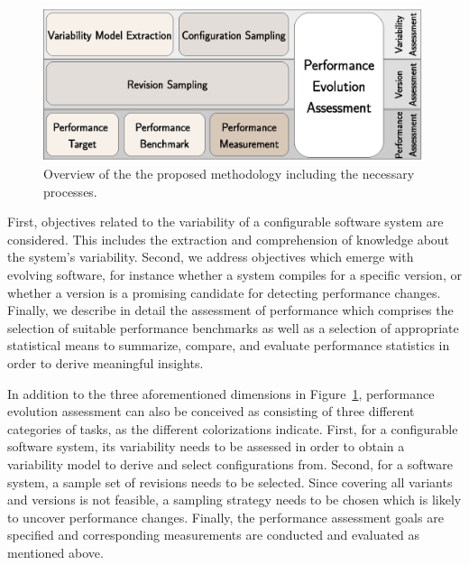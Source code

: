 \begin{figure}[h!]
	\centering
	\includegraphics[width=0.99\textwidth]{images/process_overview.eps}
	\caption{Overview of the the proposed methodology including the necessary processes.}
	\label{fig:overview}
\end{figure}

First, objectives related to the variability of a configurable software system
are considered. This includes the extraction and comprehension of knowledge
about the system’s variability. Second, we address objectives which emerge with
evolving software, for instance whether a system compiles for a specific
version, or whether a version is a promising candidate for detecting
performance changes. Finally, we describe in detail the assessment of
performance which comprises the selection of suitable performance benchmarks as
well as a selection of appropriate statistical means to summarize, compare, and
evaluate performance statistics in order to derive meaningful insights.

In addition to the three aforementioned dimensions in Figure~\ref{fig:overview},
performance evolution assessment can also be conceived as consisting of three different
categories of tasks, as the different colorizations indicate. 
First, for a configurable software system, its variability needs to be
assessed in order to obtain a variability model to derive and
select configurations from.
Second, for a software system, a sample set of revisions needs to be selected.
Since covering all variants and versions is not feasible, a sampling strategy needs to be chosen
which is likely to uncover performance changes. Finally, the
performance assessment goals are specified and corresponding
measurements are conducted and evaluated as mentioned above. \\

